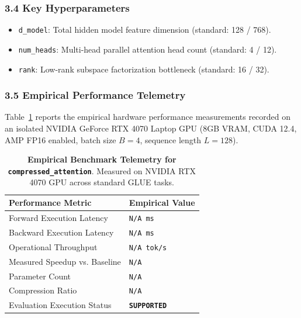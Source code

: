 \subsubsection*{3.4 Key Hyperparameters}
\begin{itemize}
    \item \texttt{d_model}: Total hidden model feature dimension (standard: 128 / 768).
    \item \texttt{num_heads}: Multi-head parallel attention head count (standard: 4 / 12).
    \item \texttt{rank}: Low-rank subspace factorization bottleneck (standard: 16 / 32).
\end{itemize}

\subsubsection*{3.5 Empirical Performance Telemetry}
Table~\ref{tab:telemetry_compressed\_attention} reports the empirical hardware performance measurements recorded on an isolated NVIDIA GeForce RTX 4070 Laptop GPU (8GB VRAM, CUDA 12.4, AMP FP16 enabled, batch size $B=4$, sequence length $L=128$).

\begin{table}[h]
\centering
\small
\caption{\textbf{Empirical Benchmark Telemetry for \texttt{compressed\_attention}}. Measured on NVIDIA RTX 4070 GPU across standard GLUE tasks.}
\label{tab:telemetry_compressed\_attention}
\begin{tabularx}{\columnwidth}{lX}
\toprule
\textbf{Performance Metric} & \textbf{Empirical Value} \\
\midrule
Forward Execution Latency & \texttt{N/A ms} \\
Backward Execution Latency & \texttt{N/A ms} \\
Operational Throughput & \texttt{N/A tok/s} \\
Measured Speedup vs. Baseline & \texttt{N/A} \\
Parameter Count & \texttt{N/A} \\
Compression Ratio & \texttt{N/A} \\
Evaluation Execution Status & \textbf{\texttt{SUPPORTED}} \\
\bottomrule
\end{tabularx}
\end{table}

